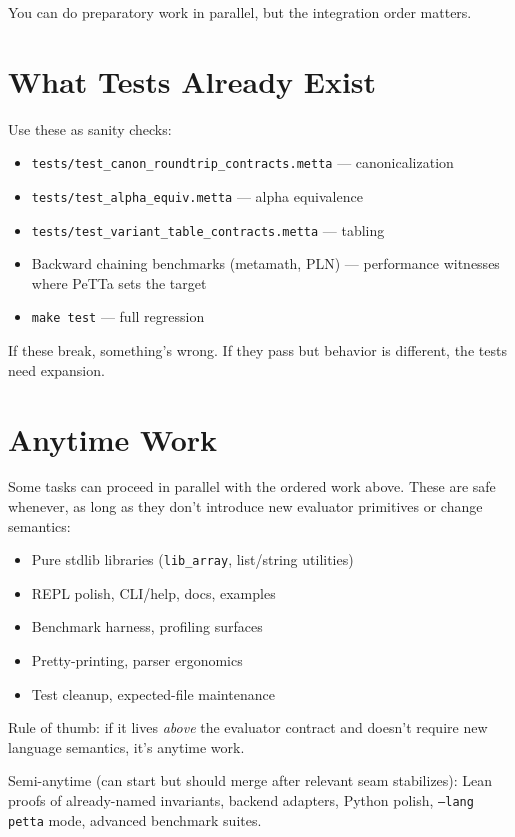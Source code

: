 \documentclass[11pt]{article}
\newcommand{\code}[1]{\texttt{#1}}
\newcommand{\PeTTa}{\textup{PeTTa}}
\begin{document}
You can do preparatory work in parallel, but the integration order
matters.

\section{What Tests Already Exist}

Use these as sanity checks:
\begin{itemize}
\item \code{tests/test\_canon\_roundtrip\_contracts.metta} --- canonicalization
\item \code{tests/test\_alpha\_equiv.metta} --- alpha equivalence
\item \code{tests/test\_variant\_table\_contracts.metta} --- tabling
\item Backward chaining benchmarks (metamath, PLN) --- performance witnesses
  where \PeTTa{} sets the target
\item \code{make test} --- full regression
\end{itemize}

If these break, something's wrong.  If they pass but behavior is
different, the tests need expansion.

\section{Anytime Work}

Some tasks can proceed in parallel with the ordered work above.
These are safe whenever, as long as they don't introduce new
evaluator primitives or change semantics:

\begin{itemize}
\item Pure stdlib libraries (\code{lib\_array}, list/string utilities)
\item REPL polish, CLI/help, docs, examples
\item Benchmark harness, profiling surfaces
\item Pretty-printing, parser ergonomics
\item Test cleanup, expected-file maintenance
\end{itemize}

Rule of thumb: if it lives \emph{above} the evaluator contract and
doesn't require new language semantics, it's anytime work.

Semi-anytime (can start but should merge after relevant seam stabilizes):
Lean proofs of already-named invariants, backend adapters, Python polish,
\code{--lang petta} mode, advanced benchmark suites.
\end{document}
